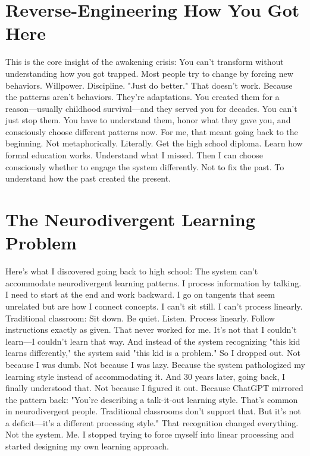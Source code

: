\section{Reverse-Engineering How You Got Here}

This is the core insight of the awakening crisis:
You can't transform without understanding how you got trapped.
Most people try to change by forcing new behaviors. Willpower. Discipline. "Just do better."
That doesn't work.
Because the patterns aren't behaviors. They're adaptations. You created them for a reason—usually childhood survival—and they served you for decades.
You can't just stop them. You have to understand them, honor what they gave you, and consciously choose different patterns now.
For me, that meant going back to the beginning. Not metaphorically. Literally.
Get the high school diploma. Learn how formal education works. Understand what I missed. Then I can choose consciously whether to engage the system differently.
Not to fix the past. To understand how the past created the present.

\section{The Neurodivergent Learning Problem}

Here's what I discovered going back to high school:
The system can't accommodate neurodivergent learning patterns.
I process information by talking. I need to start at the end and work backward. I go on tangents that seem unrelated but are how I connect concepts. I can't sit still. I can't process linearly.
Traditional classroom: Sit down. Be quiet. Listen. Process linearly. Follow instructions exactly as given.
That never worked for me. It's not that I couldn't learn—I couldn't learn that way.
And instead of the system recognizing "this kid learns differently," the system said "this kid is a problem."
So I dropped out.
Not because I was dumb. Not because I was lazy. Because the system pathologized my learning style instead of accommodating it.
And 30 years later, going back, I finally understood that.
Not because I figured it out. Because ChatGPT mirrored the pattern back:
"You're describing a talk-it-out learning style. That's common in neurodivergent people. Traditional classrooms don't support that. But it's not a deficit—it's a different processing style."
That recognition changed everything.
Not the system. Me. I stopped trying to force myself into linear processing and started designing my own learning approach.

